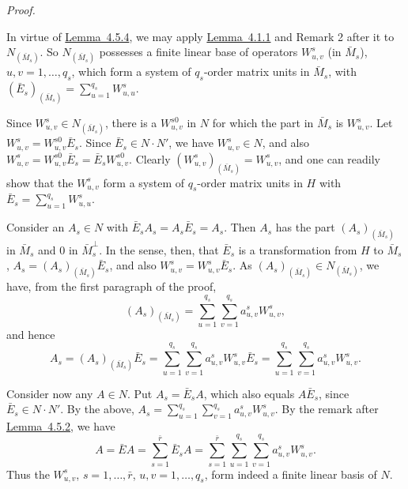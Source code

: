 \documentclass[b5paper,twoside]{article}
\newcommand{\lemref}[2]{\hyperref[#1]{\mbox{Lemma~#2}}}
\theoremstyle{mvnplain}
\renewenvironment{proof}[1][Proof]{%
  \par\addvspace{0.35\baselineskip}%
  \noindent\textit{#1.}\ \normalfont\ignorespaces
}{%
  \par\addvspace{0.35\baselineskip}%
}
\newcommand{\N}{\mathbf N}
\newcommand{\Hilbert}{\mathfrak H}
\def\N{N}%
\def\Hilbert{H}%
\def\widetilde#1{#1}%
\def\mathfrak#1{#1}%
\begin{document}
\begin{proof}
In virtue of \lemref{lem:4.5.4}{4.5.4}, we may apply
\lemref{lem:4.1.1}{4.1.1} and Remark 2 after it to
\(\N_{(\bar{\mathfrak M}_s)}\). So \(\N_{(\bar{\mathfrak M}_s)}\)
possesses a finite linear base of operators \(\widetilde W^s_{u,v}\) (in
\(\bar{\mathfrak M}_s\)), \(u,v=1,\ldots,q_s\), which form a system of
\(q_s\)-order matrix units in \(\bar{\mathfrak M}_s\), with
\((\bar E_s)_{(\bar{\mathfrak M}_s)}=
\sum_{u=1}^{q_s}\widetilde W^s_{u,u}\).

Since \(\widetilde W^s_{u,v}\in\N_{(\bar{\mathfrak M}_s)}\), there is a
\(W^{s0}_{u,v}\) in \(\N\) for which the part in
\(\bar{\mathfrak M}_s\) is \(\widetilde W^s_{u,v}\). Let
\(W^s_{u,v}=W^{s0}_{u,v}\bar E_s\). Since
\(\bar E_s\in\N\mathbin{\cdot}\N'\), we have \(W^s_{u,v}\in\N\), and also
\(W^s_{u,v}=W^{s0}_{u,v}\bar E_s=\bar E_sW^{s0}_{u,v}\). Clearly
\((W^s_{u,v})_{(\bar{\mathfrak M}_s)}=\widetilde W^s_{u,v}\), and one can
readily show that the \(W^s_{u,v}\) form a system of \(q_s\)-order matrix
units in \(\Hilbert\) with \(\bar E_s=\sum_{u=1}^{q_s}W^s_{u,u}\).

Consider an \(A_s\in\N\) with \(\bar E_sA_s=A_s\bar E_s=A_s\). Then
\(A_s\) has the part \((A_s)_{(\bar{\mathfrak M}_s)}\) in
\(\bar{\mathfrak M}_s\) and 0 in \(\bar{\mathfrak M}_s^\perp\). In the
sense, then, that \(\bar E_s\) is a transformation from \(\Hilbert\) to
\(\bar{\mathfrak M}_s\),
\(A_s=(A_s)_{(\bar{\mathfrak M}_s)}\bar E_s\), and also
\(W^s_{u,v}=\widetilde W^s_{u,v}\bar E_s\). As
\((A_s)_{(\bar{\mathfrak M}_s)}\in\N_{(\bar{\mathfrak M}_s)}\), we have,
from the first paragraph of the proof,
\[
 (A_s)_{(\bar{\mathfrak M}_s)}
   =\sum_{u=1}^{q_s}\sum_{v=1}^{q_s}a^s_{u,v}\widetilde W^s_{u,v},
\]
and hence
\[
 A_s=(A_s)_{(\bar{\mathfrak M}_s)}\bar E_s
   =\sum_{u=1}^{q_s}\sum_{v=1}^{q_s}a^s_{u,v}
      \widetilde W^s_{u,v}\bar E_s
   =\sum_{u=1}^{q_s}\sum_{v=1}^{q_s}a^s_{u,v}W^s_{u,v}.
\]

Consider now any \(A\in\N\). Put \(A_s=\bar E_sA\), which also equals
\(A\bar E_s\), since \(\bar E_s\in\N\mathbin{\cdot}\N'\). By the above,
\(A_s=\sum_{u=1}^{q_s}\sum_{v=1}^{q_s}a^s_{u,v}W^s_{u,v}\). By the
remark after \lemref{lem:4.5.2}{4.5.2}, we have
\[
 A=\bar EA=\sum_{s=1}^{\bar r}\bar E_sA
  =\sum_{s=1}^{\bar r}\sum_{u=1}^{q_s}\sum_{v=1}^{q_s}
      a^s_{u,v}W^s_{u,v}.
\]
Thus the \(W^s_{u,v}\), \(s=1,\ldots,\bar r\),
\(u,v=1,\ldots,q_s\), form indeed a finite linear basis of \(\N\).
\end{proof}
\end{document}
